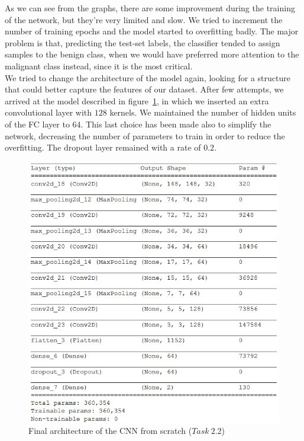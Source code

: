 \documentclass[11pt,a4paper,oneside]{article}
\begin{document}
As we can see from the graphs, there are some improvement during the training of the network, but they're very limited and slow. We tried to increment the number of training epochs and the model started to overfitting badly. The major problem is that, predicting the test-set labels, the classifier tended to assign samples to the benign class, when we would have preferred more attention to the malignant class instead, since it is the most critical.\\

We tried to change the architecture of the model again, looking for a structure that could better capture the features of our dataset. After few attempts, we arrived at the model described in figure~\ref{fig:model_2.2_1}, in which we inserted an extra convolutional layer with $128$ kernels. We maintained the number of hidden units of the FC layer to $64$. This last choice has been made also to simplify the network, decreasing the number of parameters to train in order to reduce the overfitting. The dropout layer remained with a rate of $0.2$.

\begin{figure}[h]
\centering
\includegraphics[width=.5\textwidth]{images/2.2/1_model}
\caption{Final architecture of the CNN from scratch ($Task\ 2.2$)}
\label{fig:model_2.2_1}
\end{figure}

\clearpage
\end{document}
